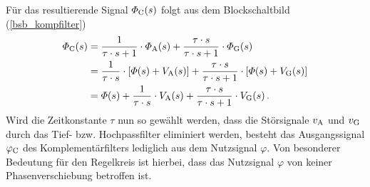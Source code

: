 Für das resultierende Signal $\varPhi_{\text{C}}(s)$ folgt aus dem Blockschaltbild (\ref{bsb_kompfilter})
\begin{equation}
\begin{split}
\varPhi_{\text{C}}(s) &= \frac{1}{\tau \cdot s + 1}\cdot \varPhi_{\text{A}}(s) + \frac{\tau \cdot s}{\tau\cdot s + 1}\cdot \varPhi_{\text{G}}(s)
\\
&= \frac{1}{\tau\cdot s}\cdot \left[\varPhi(s) + V_{\text{A}}(s)\right] + \frac{\tau\cdot s}{\tau\cdot s + 1}\cdot \left[\varPhi(s) + V_{\text{G}}(s)\right]
\\
&= \varPhi(s) + \frac{1}{\tau\cdot s}\cdot V_{\text{A}}(s) + \frac{\tau\cdot s}{\tau\cdot s + 1}\cdot V_{\text{G}}(s) \,.
\end{split}
\end{equation}
Wird die Zeitkonstante $\tau$ nun so gewählt werden, dass die Störsignale $v_{\text{A}}$ und $v_{\text{G}}$ durch das Tief- bzw. Hochpassfilter eliminiert werden, besteht das Ausgangssignal $\varphi_{\text{C}}$ des Komplementärfilters lediglich aus dem Nutzsignal $\varphi$. Von besonderer Bedeutung für den Regelkreis ist hierbei, dass das Nutzsignal $\varphi$ von keiner Phasenverschiebung betroffen ist.

